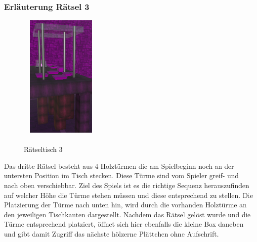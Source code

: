 \subsubsection{Erläuterung Rätsel 3}
\begin{figure}
	\vspace*{-1.5cm}
	\includegraphics[width=4cm, height=6cm]{Pictures/Tisch3}
	\caption{\\ \noindent Rätseltisch 3}
	\vspace*{-1cm}
	\label{fig:tisch3}
\end{figure}
Das dritte Rätsel besteht aus 4 Holztürmen die am Spielbeginn noch an der untersten Position im Tisch stecken. Diese Türme sind vom Spieler greif- und nach oben verschiebbar. Ziel des Spiels ist es die richtige Sequenz herauszufinden auf welcher Höhe die Türme stehen müssen und diese entsprechend zu stellen. Die Platzierung der Türme nach unten hin, wird durch die vorhanden Holztürme an den jeweiligen Tischkanten dargestellt. Nachdem das Rätsel gelöst wurde und die Türme entsprechend platziert, öffnet sich hier ebenfalls die kleine Box daneben und gibt damit Zugriff das nächste hölzerne Plättchen ohne Aufschrift.\\

